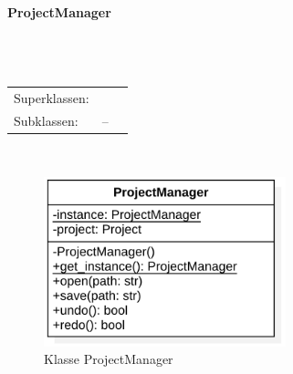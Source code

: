 \documentclass{article}
\newcommand{\classheader}[2][]{\paragraph{#2}
\mbox{}\textit{#1}\\\\}
\newcommand{\classref}[1]{\texttt{\nameref{cls:#1}}}
\begin{document}
\newpage
\classheader{ProjectManager}\label{cls:ProjectManager}
\begin{tabular}{lll}
 Superklassen: & \classref{FileManager}\\
 Subklassen: & --
\end{tabular}\\
\begin{figure}[H]%
    \centering
    \includegraphics[width=7cm]{entwurf/Floriane/ProjectManager.png}
    \caption{Klasse ProjectManager}
\end{figure}
\end{document}
